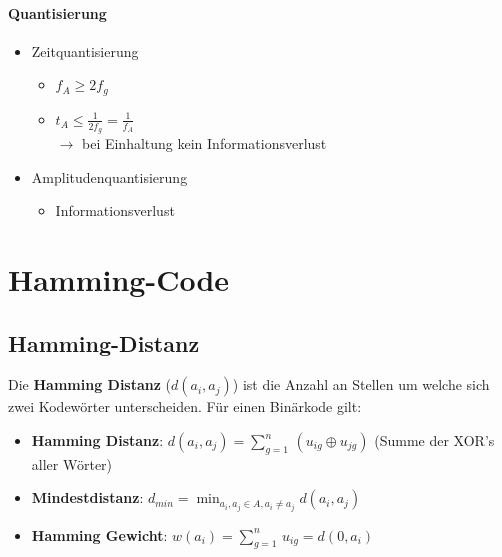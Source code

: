 \documentclass[12pt,a4paper]{article}
\begin{document}
\paragraph{Quantisierung\\}
\begin{itemize}
\item Zeitquantisierung
\begin{itemize}
\item $f_A \geq 2 f_g$
\item $t_A \leq \frac{1}{2 f_g} = \frac{1}{f_A}$\\
$\rightarrow$ bei Einhaltung kein Informationsverlust
\end{itemize}
\item Amplitudenquantisierung
\begin{itemize}
\item Informationsverlust
\end{itemize}
\end{itemize}



\section{Hamming-Code}

\subsection{Hamming-Distanz}
Die \textbf{Hamming Distanz} ($d(a_i, a_j)$) ist die Anzahl an Stellen um welche sich zwei Kodewörter unterscheiden. Für einen Binärkode gilt:\\
\begin{itemize}
\item \textbf{Hamming Distanz}: $d(a_i, a_j) = \sum_{g=1}^n \, (u_{ig} \oplus u_{jg})$ (Summe der XOR's aller Wörter)
\item \textbf{Mindestdistanz}: $d_{min} = \min_{a_i, a_j \in A, a_i \neq a_j} d(a_i, a_j)$
\item \textbf{Hamming Gewicht}: $w(a_i) = \sum_{g=1}^n \, u_{ig} = d(0, a_i)$
\end{itemize}
\end{document}
